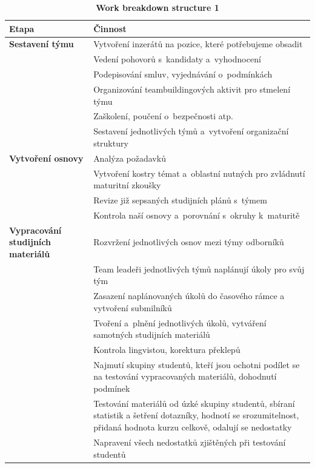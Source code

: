 \documentclass[12pt, a4paper]{report}
\begin{document}
\begin{table}[htbp]
\caption{\label{tab:org8959181}
\textbf{Work breakdown structure 1}}
\centering
\scriptsize
\begin{tabularx}{\textwidth}{|X|X|}
\hline
Etapa & Činnost\\
\hline
\textbf{Sestavení týmu} & Vytvoření inzerátů na pozice, které potřebujeme obsadit\\
\hline
 & Vedení pohovorů s kandidaty a vyhodnocení\\
\hline
 & Podepisování smluv, vyjednávání o podmínkách\\
\hline
 & Organizování teambuildingových aktivit pro stmelení týmu\\
\hline
 & Zaškolení, poučení o bezpečnosti atp.\\
\hline
 & Sestavení jednotlivých týmů a vytvoření organizační struktury\\
\hline
\textbf{Vytvoření osnovy} & Analýza požadavků\\
\hline
 & Vytvoření kostry témat a oblastní nutných pro zvládnutí maturitní zkoušky\\
\hline
 & Revize již sepsaných studijních plánů s týmem\\
\hline
 & Kontrola naší osnovy a porovnání s okruhy k maturitě\\
\hline
\textbf{Vypracování studijních materiálů} & Rozvržení jednotlivých osnov mezi týmy odborníků\\
\hline
 & Team leadeři jednotlivých týmů naplánují úkoly pro svůj tým\\
\hline
 & Zasazení naplánovaných úkolů do časového rámce a vytvoření submilníků\\
\hline
 & Tvoření a plnění jednotlivých úkolů, vytváření samotných studijních materiálů\\
\hline
 & Kontrola lingvistou, korektura překlepů\\
\hline
 & Najmutí skupiny studentů, kteří jsou ochotni podílet se na testování vypracovaných materiálů, dohodnutí podmínek\\
\hline
 & Testování materiálů od úzké skupiny studentů, sbíraní statistik a šetření dotazníky, hodnotí se srozumitelnost, přidaná hodnota kurzu celkově, odalují se nedostatky\\
\hline
 & Napravení všech nedostatků zjištěných při testování studentů\\
\hline
\end{tabularx}
\end{table}
\end{document}
